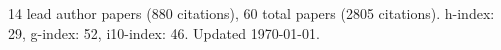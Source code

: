 14 lead author papers (880 citations),
60 total papers (2805 citations).\newline
h-index: 29, g-index: 52, i10-index: 46. Updated \today.